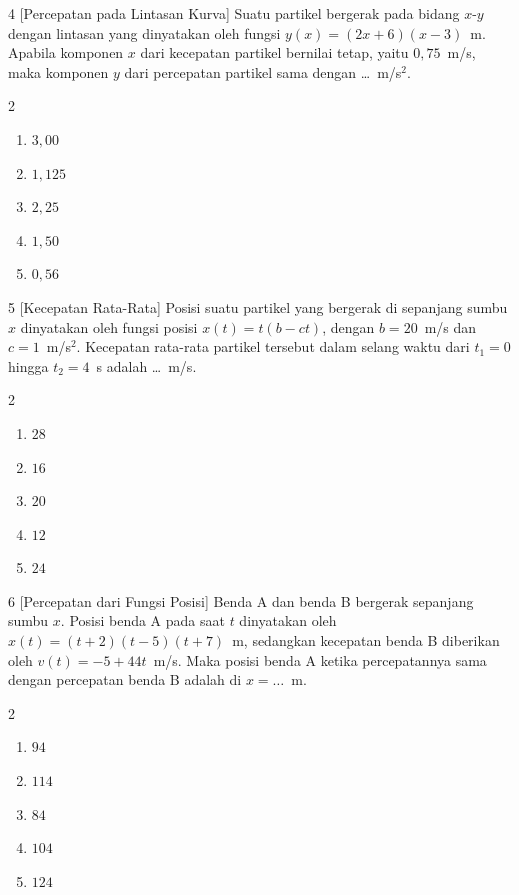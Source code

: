 \documentclass[11pt]{article}
\newenvironment{pilB}{%
  \par\smallskip\begin{multicols}{2}
  \begin{enumerate}[label=(\alph*),leftmargin=*,itemsep=1pt,topsep=3pt]}%
  {\end{enumerate}\end{multicols}}
\begin{document}
\begin{soal}{4 \normalfont\small[Percepatan pada Lintasan Kurva]}
Suatu partikel bergerak pada bidang $x$-$y$ dengan lintasan yang dinyatakan oleh fungsi
$y(x)=(2x+6)(x-3)$~m. Apabila komponen $x$ dari kecepatan partikel bernilai tetap, yaitu
$0{,}75$~m/s, maka komponen $y$ dari percepatan partikel sama dengan \ldots~m/s$^2$.
\begin{pilB}
  \item $3{,}00$ \item $1{,}125$ \item $2{,}25$ \item $1{,}50$ \item $0{,}56$
\end{pilB}
\end{soal}

\begin{soal}{5 \normalfont\small[Kecepatan Rata-Rata]}
Posisi suatu partikel yang bergerak di sepanjang sumbu $x$ dinyatakan oleh fungsi posisi
$x(t)=t(b-ct)$, dengan $b=20$~m/s dan $c=1$~m/s$^2$. Kecepatan rata-rata partikel
tersebut dalam selang waktu dari $t_1=0$ hingga $t_2=4$~s adalah \ldots~m/s.
\begin{pilB}
  \item $28$ \item $16$ \item $20$ \item $12$ \item $24$
\end{pilB}
\end{soal}

\begin{soal}{6 \normalfont\small[Percepatan dari Fungsi Posisi]}
Benda A dan benda B bergerak sepanjang sumbu $x$. Posisi benda A pada saat $t$ dinyatakan
oleh $x(t)=(t+2)(t-5)(t+7)$~m, sedangkan kecepatan benda B diberikan oleh
$v(t)=-5+44t$~m/s. Maka posisi benda A ketika percepatannya sama dengan percepatan benda B
adalah di $x=\ldots$~m.
\begin{pilB}
  \item $94$ \item $114$ \item $84$ \item $104$ \item $124$
\end{pilB}
\end{soal}
\end{document}
